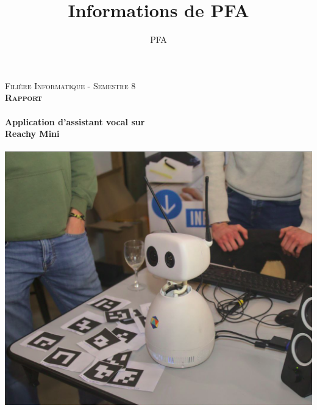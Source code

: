 \documentclass[a4paper,french]{article}
\title{Informations de PFA}
\author{PFA}
\date{\date}
\begin{document}
\begin{titlepage}
\centering
\vspace*{1\baselineskip}
\LARGE{\textsc{Filière Informatique - Semestre 8}} \\
\vspace*{\baselineskip}
\LARGE{\textsc{\bfseries{Rapport}}} \\

\vspace*{2\baselineskip}
\hrulefill \\[0.4cm]
{ \Huge \bfseries Application d'assistant vocal sur \\[0.4cm] }
{ \Huge \bfseries Reachy Mini \\[0.4cm] }
\hrulefill \\[1.5cm]
\vspace*{\baselineskip}
\centering
\includegraphics[scale=0.25]{figures/reachy_sp.png}
\\
\vspace*{2\baselineskip}


\end{titlepage}
\end{document}
